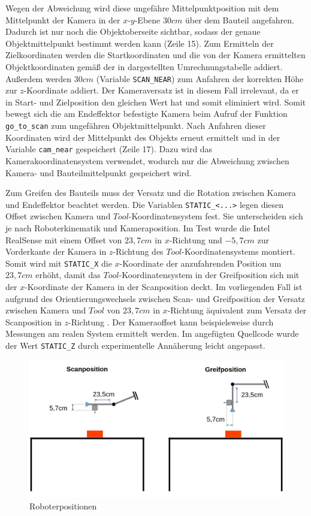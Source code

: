 Wegen der Abweichung wird diese ungefähre Mittelpunktposition mit dem Mittelpunkt der Kamera in der $x$-$y$-Ebene $30cm$ über dem Bauteil angefahren. Dadurch ist nur noch die Objektoberseite sichtbar, sodass der genaue Objektmittelpunkt bestimmt werden kann (Zeile 15). Zum Ermitteln der Zielkoordinaten werden die Startkoordinaten und die von der Kamera ermittelten Objektkoordinaten gemäß der in  dargestellten Umrechnungstabelle addiert. Außerdem werden $30cm$ (Variable \lstinline{SCAN_NEAR}) zum Anfahren der korrekten Höhe zur $z$-Koordinate addiert. Der Kameraversatz ist in diesem Fall irrelevant, da er in Start- und Zielposition den gleichen Wert hat und somit eliminiert wird. Somit bewegt sich die am Endeffektor befestigte Kamera beim Aufruf der Funktion \lstinline{go_to_scan} zum ungefähren Objektmittelpunkt. Nach Anfahren dieser Koordinaten wird der Mittelpunkt des Objekts erneut ermittelt und in der Variable \lstinline{cam_near} gespeichert (Zeile 17). Dazu wird das Kamerakoordinatensystem verwendet, wodurch nur die Abweichung zwischen Kamera- und Bauteilmittelpunkt gespeichert wird.

Zum Greifen des Bauteils muss der Versatz und die Rotation zwischen Kamera und Endeffektor beachtet werden. Die Variablen \lstinline{STATIC_<...>} legen diesen Offset zwischen Kamera und $Tool$-Koordinatensystem fest. Sie unterscheiden sich je nach Roboterkinematik und Kameraposition. Im Test wurde die Intel RealSense mit einem Offset von $23,7cm$ in $x$-Richtung und $-5,7cm$ zur Vorderkante der Kamera in $z$-Richtung des $Tool$-Koordinatensystems montiert. Somit wird mit \lstinline{STATIC_X} die $x$-Koordinate der anzufahrenden Position um $23,7cm$ erhöht, damit das $Tool$-Koordinatensystem in der Greifposition sich mit der $x$-Koordinate der Kamera in der Scanposition deckt. Im vorliegenden Fall ist aufgrund des Orientierungswechsels zwischen Scan- und Greifposition der Versatz zwischen Kamera und $Tool$ von $23,7cm$ in $x$-Richtung äquivalent zum Versatz der Scanposition in $z$-Richtung . Der Kameraoffset kann beispielsweise durch Messungen am realen System ermittelt werden. Im angefügten Quellcode wurde der Wert \lstinline{STATIC_Z} durch experimentelle Annäherung leicht angepasst.

\begin{figure}[ht]
    \centering
    \includegraphics[width=\textwidth]{Bilder/rv6l_positionen.jpg}
    \caption{Roboterpositionen}
    \label{fig:rv6l_positionen}
\end{figure}

